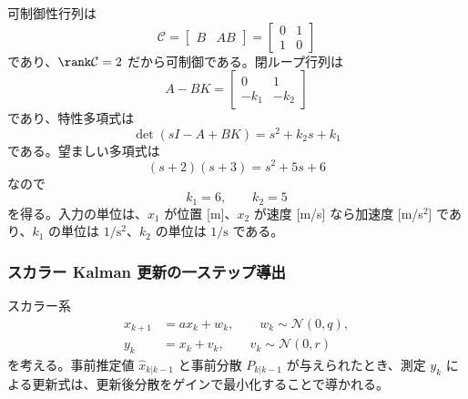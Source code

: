 \begin{derivation}
可制御性行列は
\begin{equation}
  \mathcal{C}=
  \begin{bmatrix}
    B&AB
  \end{bmatrix}
  =
  \begin{bmatrix}
    0&1\\
    1&0
  \end{bmatrix}
\end{equation}
であり、$\rank\mathcal{C}=2$ だから可制御である。閉ループ行列は
\begin{equation}
  A-BK=
  \begin{bmatrix}
    0&1\\
    -k_1&-k_2
  \end{bmatrix}
\end{equation}
であり、特性多項式は
\begin{equation}
  \det(sI-A+BK)=s^2+k_2s+k_1
\end{equation}
である。望ましい多項式は
\begin{equation}
  (s+2)(s+3)=s^2+5s+6
\end{equation}
なので
\begin{equation}
  k_1=6,\qquad k_2=5
\end{equation}
を得る。入力の単位は、$x_1$ が位置 [m]、$x_2$ が速度 [m/s] なら加速度 [m/s$^2$] であり、$k_1$ の単位は $1/\mathrm{s}^2$、$k_2$ の単位は $1/\mathrm{s}$ である。
\end{derivation}

\subsubsection{スカラー Kalman 更新の一ステップ導出}

スカラー系
\begin{align}
  x_{k+1}&=ax_k+w_k,\qquad w_k\sim\mathcal{N}(0,q),\\
  y_k&=x_k+v_k,\qquad v_k\sim\mathcal{N}(0,r)
\end{align}
を考える。事前推定値 $\hat{x}_{k|k-1}$ と事前分散 $P_{k|k-1}$ が与えられたとき、測定 $y_k$ による更新式は、更新後分散をゲインで最小化することで導かれる。

